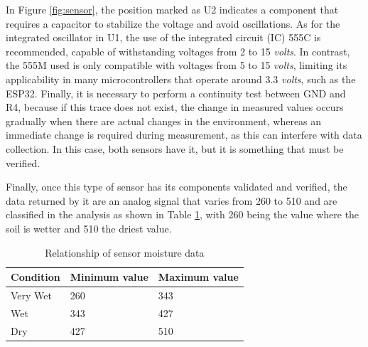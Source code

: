 \documentclass[journal]{IEEEtran}
\begin{document}
In Figure \ref{fig:sensor}, the position marked as U2 indicates a component that requires a capacitor to stabilize the voltage and avoid oscillations. As for the integrated oscillator in U1, the use of the integrated circuit (IC) 555C is recommended, capable of withstanding voltages from 2 to 15 \textit{volts}. In contrast, the 555M used is only compatible with voltages from 5 to 15 \textit{volts}, limiting its applicability in many microcontrollers that operate around 3.3 \textit{volts}, such as the ESP32. Finally, it is necessary to perform a continuity test between GND and R4, because if this trace does not exist, the change in measured values occurs gradually when there are actual changes in the environment, whereas an immediate change is required during measurement, as this can interfere with data collection. In this case, both sensors have it, but it is something that must be verified.

Finally, once this type of sensor has its components validated and verified, the data returned by it are an analog signal that varies from 260 to 510 and are classified in the analysis as shown in Table \ref{tab:Relationship}, with 260 being the value where the soil is wetter and 510 the driest value.

\begin{table}[h!]
	\centering
    \caption{Relationship of sensor moisture data}
		\begin{tabular}{p{2.5cm}|p{2.3cm}|p{2.0cm}}\hline
\textbf{Condition}&\textbf{Minimum value}&\textbf{Maximum value}\\\hline\hline
Very Wet&260&343\\\hline
Wet&343&427\\ \hline
Dry&427 &510\\\hline
	\end{tabular}
 \label{tab:Relationship}
\end{table}
\end{document}
